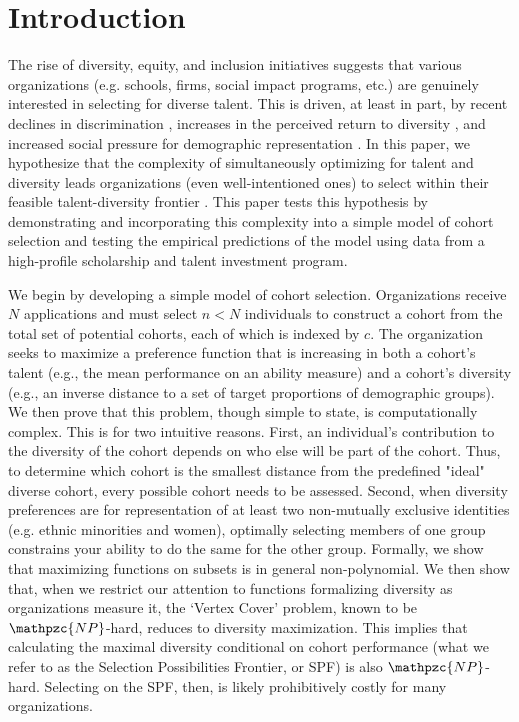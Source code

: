 \section{Introduction}\label{sec:introduction}
The rise of diversity, equity, and inclusion initiatives suggests that various organizations (e.g. schools, firms, social impact programs, etc.) are genuinely interested in selecting for diverse talent. This is driven, at least in part, by recent declines in discrimination \cite{hsieh2019allocation}, increases in the perceived return to diversity \cite{deming2017growing, page2019diversity, noray2023systemic}, and increased social pressure for demographic representation \cite{minkin2023diversity}. In this paper, we hypothesize that the complexity of simultaneously optimizing for talent and diversity leads organizations (even well-intentioned ones) to select within their feasible talent-diversity frontier \cite{nemhauser1978analysis, huppenkothen2020entrofy}. This paper tests this hypothesis by demonstrating and incorporating this complexity into a simple model of cohort selection and testing the empirical predictions of the model using data from a high-profile scholarship and talent investment program. 

We begin by developing a simple model of cohort selection. Organizations receive $N$ applications and must select $n<N$ individuals to construct a cohort from the total set of potential cohorts, each of which is indexed by $c$. The organization seeks to maximize a preference function that is increasing in both a cohort's talent (e.g., the mean performance on an ability measure) and a cohort's diversity (e.g., an inverse distance to a set of target proportions of demographic groups). We then prove that this problem, though simple to state, is computationally complex. This is for two intuitive reasons. First, an individual's contribution to the diversity of the cohort depends on who else will be part of the cohort. Thus, to determine which cohort is the smallest distance from the predefined "ideal" diverse cohort, every possible cohort needs to be assessed. Second, when diversity preferences are for representation of at least two non-mutually exclusive identities (e.g. ethnic minorities and women), optimally selecting members of one group constrains your ability to do the same for the other group. Formally, we show that maximizing functions on subsets is in general non-polynomial. We then show that, when we restrict our attention to functions formalizing diversity as organizations measure it, the `Vertex Cover' problem, known to be $\mathpzc{NP}$-hard, reduces to diversity maximization. This implies that calculating the maximal diversity conditional on cohort performance (what we refer to as the Selection Possibilities Frontier, or SPF) is also $\mathpzc{NP}$-hard. Selecting on the SPF, then, is likely prohibitively costly for many organizations. 

